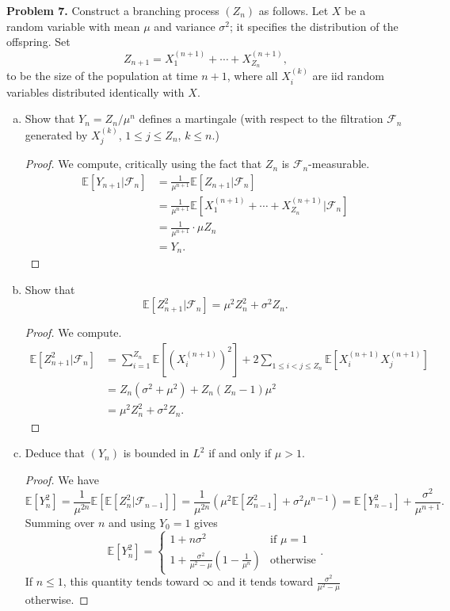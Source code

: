 \documentclass[11pt,letterpaper]{report}
\newcommand{\mcal}[1]{\mathcal{#1}}
\newcommand{\E}{\mathbb{E}}
\begin{document}
\noindent\textbf{Problem 7. }
Construct a branching process $(Z_n)$ as follows. Let $X$ be a random variable with mean $\mu$ and variance $\sigma^2$; it specifies the distribution of the offspring. Set
\[
Z_{n+1} = X_1^{(n+1)} + \cdots + X_{Z_n}^{(n+1)},
\]
to be the size of the population at time $n+1$, where all $X_i^{(k)}$ are iid random variables distributed identically with $X$.
\begin{enumerate}[(a)]
	\item Show that $Y_n = Z_n/\mu^n$ defines a martingale (with respect to the filtration $\mcal{F}_n$ generated by $X_j^{(k)}$, $1\leq j\leq Z_n$, $k\leq n$.)
	\begin{proof}
		We compute, critically using the fact that $Z_n$ is $\mcal{F}_n$-measurable.
		\begin{align*}
			\E[Y_{n+1}|\mcal{F}_n] &= \frac{1}{\mu^{n+1}}\E[Z_{n+1}|\mcal{F}_n]\\
			&= \frac{1}{\mu^{n+1}}\E[X_1^{(n+1)} + \cdots + X_{Z_n}^{(n+1)}|\mcal{F}_n]\\
			&= \frac{1}{\mu^{n+1}}\cdot \mu Z_n\\
			&= Y_n.
		\end{align*}
	\end{proof}

	\item Show that
	\[
	\E[Z_{n+1}^2|\mcal{F}_n] = \mu^2Z_n^2 + \sigma^2Z_n.
	\]
	\begin{proof}
		We compute.
		\begin{align*}
			\E[Z_{n+1}^2|\mcal{F}_n] &= \sum_{i=1}^{Z_n}\E[(X^{(n+1)}_i)^2] + 2\sum_{1\leq i<j\leq Z_n}\E[X_i^{(n+1)}X_j^{(n+1)}]\\
			&= Z_n(\sigma^2+\mu^2) + Z_n(Z_n-1)\mu^2\\
			&= \mu^2Z_n^2 + \sigma^2Z_n.
		\end{align*}
	\end{proof}

	\item Deduce that $(Y_n)$ is bounded in $L^2$ if and only if $\mu>1$.
	\begin{proof}
		We have
		\[
		\E[Y_n^2] = \frac{1}{\mu^{2n}}\E[\E[Z_n^2|\mcal{F}_{n-1}]] = \frac{1}{\mu^{2n}}(\mu^2\E[Z_{n-1}^2] + \sigma^2\mu^{n-1}) = \E[Y_{n-1}^2] + \frac{\sigma^2}{\mu^{n+1}}.
		\]
		Summing over $n$ and using $Y_0 = 1$ gives
		\[
		\E[Y_n^2] = \begin{cases}
			1+n\sigma^2&\text{if }\mu=1\\
			1+\frac{\sigma^2}{\mu^2-\mu}(1-\frac{1}{\mu^n})&\text{otherwise}
		\end{cases}.
		\]
		If $n\leq 1$, this quantity tends toward $\infty$ and it tends toward $\frac{\sigma^2}{\mu^2-\mu}$ otherwise.
	\end{proof}


\end{enumerate}
\end{document}
